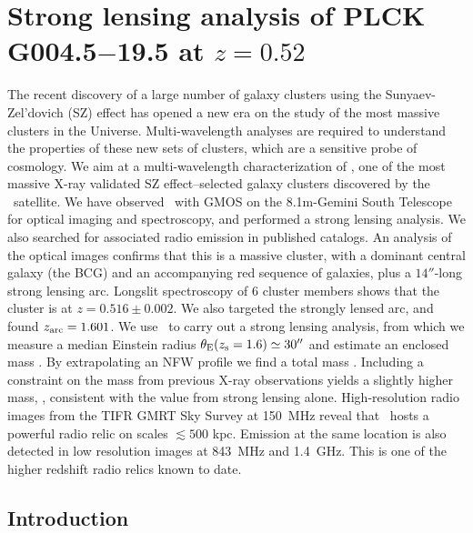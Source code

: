 
\chapter{Strong lensing analysis of PLCK G004.5$-$19.5 at $z=0.52$}
\label{chapter:plckg45}

\begin{small}
The recent discovery of a large number of galaxy clusters using the Sunyaev-Zel'dovich (SZ) effect has opened a new  era on the study of the most massive clusters in the Universe. Multi-wavelength analyses are required to understand the properties of these new sets of clusters, which are a sensitive probe of cosmology.
%
We aim at a multi-wavelength characterization of \plck, one of the most massive X-ray validated SZ effect--selected galaxy clusters discovered by the \planck\ satellite.
%
We have observed \plck\ with GMOS on the 8.1m-Gemini South Telescope for optical imaging and spectroscopy, and performed a strong lensing analysis. We also searched for associated radio emission in published catalogs.
%
An analysis of the optical images confirms that this is a massive cluster, with a dominant central galaxy (the BCG) and an accompanying red sequence of galaxies, plus a $14''$-long strong lensing arc. Longslit spectroscopy of 6 cluster members shows that the cluster is at $z=0.516\pm0.002$. We also targeted the strongly lensed arc, and found $z_{\rm arc}=1.601$. We use \lenstool\ to carry out a strong lensing analysis, from which we measure a median Einstein radius $\theta_{\rm E}(z_{\rm s}=1.6)\simeq30''$ and estimate an enclosed mass \emass. By extrapolating an NFW profile we find a total mass \mass. Including a constraint on the mass from previous X-ray observations yields a slightly higher mass, \mslx, consistent with the value from strong lensing alone. High-resolution radio images from the TIFR GMRT Sky Survey at 150~MHz reveal that \plck\ hosts a powerful radio relic on scales $\lesssim500$ kpc. Emission at the same location is also detected in low resolution images at 843~MHz and 1.4~GHz. This is one of the higher redshift radio relics known to date.
\end{small}



\pagebreak

\section{Introduction}

